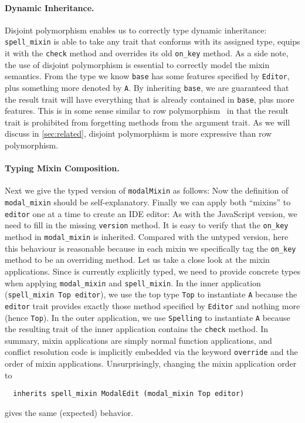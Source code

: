 \paragraph{Dynamic Inheritance.}

Disjoint polymorphism enables us to correctly type dynamic inheritance:
\lstinline{spell_mixin} is able to take any trait that conforms with its
assigned type, equips it with the \lstinline{check} method and overrides its
old \lstinline{on_key} method. As a side note, the use of disjoint polymorphism
is essential to correctly model the mixin semantics. From the type we know
\lstinline{base} has some features specified by \lstinline{Editor}, plus
something more denoted by \lstinline{A}. By inheriting \lstinline{base}, we are
guaranteed that the result trait will have everything that is already contained
in \lstinline{base}, plus more features. This is in some sense similar to row
polymorphism~\citep{wand1994type} in that the result trait is prohibited from
forgetting methods from the argument trait. As we will discuss in
\cref{sec:related}, disjoint polymorphism is more expressive than row
polymorphism.


\paragraph{Typing Mixin Composition.}
Next we give the typed version of \lstinline{modalMixin} as follows:
Now the definition of \lstinline{modal_mixin} should be self-explanatory.
Finally we can apply both ``mixins'' to \lstinline{editor} one at a time to create
an IDE editor:
As with the JavaScript version, we need to fill in the missing
\lstinline{version} method. It is easy to verify that the \lstinline{on_key} method
in \lstinline{modal_mixin} is inherited. Compared with the untyped version,
here this behaviour is reasonable because in each mixin we specifically tag the
\lstinline{on_key} method to be an overriding method. Let us take a close look
at the mixin applications. Since \sedel is currently explicitly typed, we need to
provide concrete types when applying \lstinline{modal_mixin} and \lstinline{spell_mixin}.
In the inner application (\lstinline{spell_mixin Top editor}), we use the top
type \lstinline{Top} to instantiate \lstinline{A} because the \lstinline{editor} trait
provides exactly those method specified by \lstinline{Editor} and nothing more
(hence \lstinline{Top}). In the outer application, we use \lstinline{Spelling}
to instantiate \lstinline{A} because the resulting trait of the inner application
contains the \lstinline{check} method.
In summary, mixin applications are simply normal function applications,
and conflict resolution code is implicitly embedded via the keyword \lstinline{override}
and the order of mixin applications.
Unsurprisingly, changing the mixin application order to
\begin{lstlisting}
  inherits spell_mixin ModalEdit (modal_mixin Top editor)
\end{lstlisting}
gives the same (expected) behavior.


